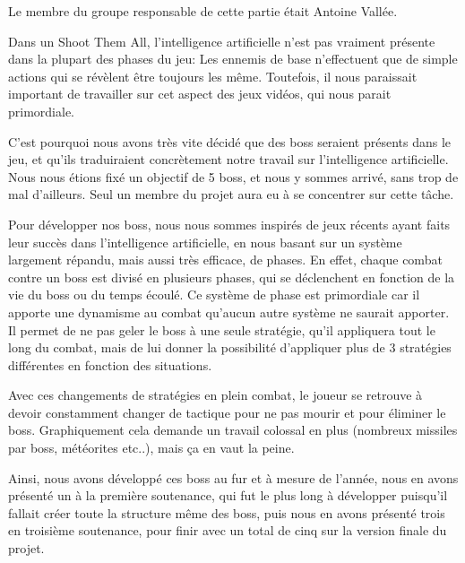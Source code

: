 \par Le membre du groupe responsable de cette partie était Antoine Vallée.

\par Dans un Shoot Them All, l'intelligence artificielle n'est pas vraiment présente dans la plupart des phases du jeu: Les ennemis de base n'effectuent que de simple actions qui se révèlent être toujours les même. Toutefois, il nous paraissait important de travailler sur cet aspect des jeux vidéos, qui nous parait primordiale.
\par C'est pourquoi nous avons très vite décidé que des boss seraient présents dans le jeu, et qu'ils traduiraient concrètement notre travail sur l'intelligence artificielle. Nous nous étions fixé un objectif de 5 boss, et nous y sommes arrivé, sans trop de mal d'ailleurs. Seul un membre du projet aura eu à se concentrer sur cette tâche.
\par Pour développer nos boss, nous nous sommes inspirés de jeux récents ayant faits leur succès dans l'intelligence artificielle, en nous basant sur un système largement répandu, mais aussi très efficace, de phases. En effet, chaque combat contre un boss est divisé en plusieurs phases, qui se déclenchent en fonction de la vie du boss ou du temps écoulé. Ce système de phase est primordiale car il apporte une dynamisme au combat qu'aucun autre système ne saurait apporter. Il permet de ne pas geler le boss à une seule stratégie, qu'il appliquera tout le long du combat, mais de lui donner la possibilité d'appliquer plus de 3 stratégies différentes en fonction des situations.
\par Avec ces changements de stratégies en plein combat, le joueur se retrouve à devoir constamment changer de tactique pour ne pas mourir et pour éliminer le boss. Graphiquement cela demande un travail colossal en plus (nombreux missiles par boss, météorites etc..), mais ça en vaut la peine.
\par Ainsi, nous avons développé ces boss au fur et à mesure de l'année, nous en avons présenté un à la première soutenance, qui fut le plus long à développer puisqu'il fallait créer toute la structure même des boss, puis nous en avons présenté trois en troisième soutenance, pour finir avec un total de cinq sur la version finale du projet.

